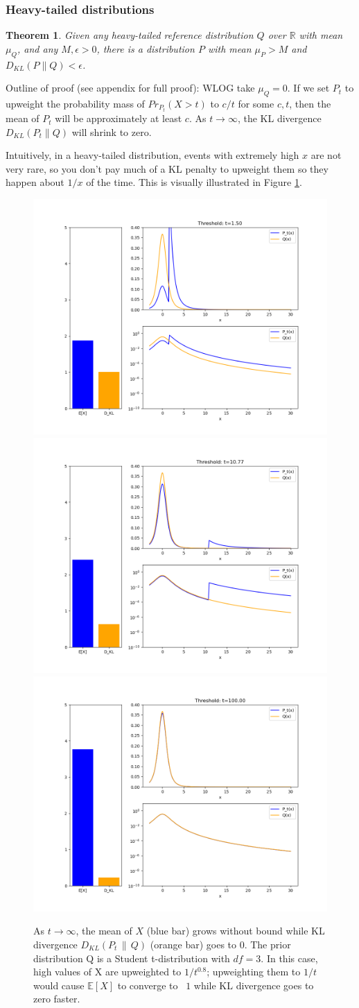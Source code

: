 \documentclass{article}
\newtheorem{theorem}{Theorem}
\begin{document}
\subsubsection{Heavy-tailed distributions}
\begin{theorem}
\label{thm1}
Given any heavy-tailed reference distribution
\(Q\) over \(\mathbb R\) with mean \(\mu_Q\), and any
\(M, \epsilon > 0\), there is a distribution \(P\) with mean \(\mu_P>M\)
and \(D_{KL}(P \| Q) < \epsilon\).
\end{theorem}

Outline of proof (see appendix for full proof): WLOG take $\mu_Q = 0$. If we set $P_t$ to upweight the probability mass of $Pr_{P_t}(X > t)$ to $c/t$ for some $c, t$, then the mean of $P_t$ will be approximately at least $c$. As $t \to \infty$, the KL divergence $D_{KL}(P_t \| Q)$ will shrink to zero.

Intuitively, in a heavy-tailed distribution, events with extremely high $x$ are not very rare, so you don’t pay much of a KL penalty to upweight them so they happen about $1/x$ of the time. This is visually illustrated in Figure \ref{fig1}.

\begin{figure}
    \label{fig1}
    \centering
    \includegraphics[width=0.3\linewidth]{goodhart_kl_001.png}
    \includegraphics[width=0.3\linewidth]{goodhart_kl_024.png}
    \includegraphics[width=0.3\linewidth]{goodhart_kl_050.png}
    \caption{As $t \to \infty$, the mean of $X$ (blue bar) grows without bound while KL divergence $D_{KL}(P_t \,\|\, Q)$ (orange bar) goes to 0. The prior distribution Q is a Student t-distribution with $df=3$. In this case, high values of X are upweighted to $1/t^{0.8}$; upweighting them to $1/t$ would cause $\mathbb E[X]$ to converge to ~$1$ while KL divergence goes to zero faster.}
\end{figure}
\end{document}
